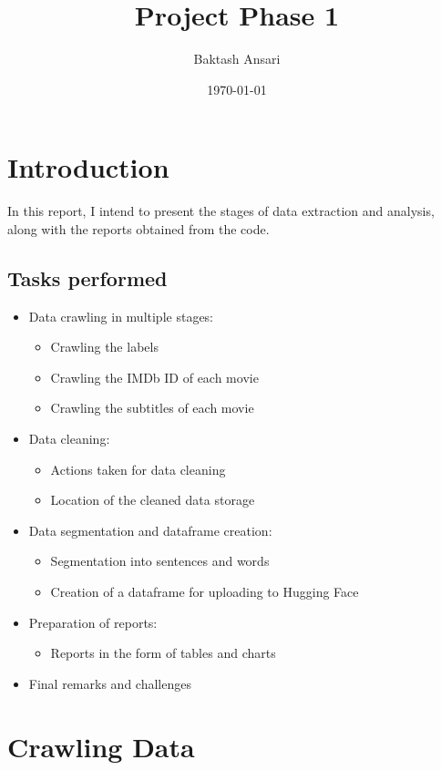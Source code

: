 \documentclass[a4paper]{article}
\title{Project Phase 1}
\author{Baktash Ansari}
\date{\today}
\begin{document}
  

\maketitle

\section{Introduction}


In this report, I intend to present the stages of data extraction and analysis, along with the reports obtained from the code.

\subsection*{Tasks performed}

\begin{itemize}
\item Data crawling in multiple stages:
\begin{itemize}
\item Crawling the labels
\item Crawling the IMDb ID of each movie
\item Crawling the subtitles of each movie
\end{itemize}
\item Data cleaning:
\begin{itemize}
\item Actions taken for data cleaning
\item Location of the cleaned data storage
\end{itemize}
\item Data segmentation and dataframe creation:
\begin{itemize}
\item Segmentation into sentences and words
\item Creation of a dataframe for uploading to Hugging Face
\end{itemize}
\item Preparation of reports:
\begin{itemize}
\item Reports in the form of tables and charts
\end{itemize}
\item Final remarks and challenges
\end{itemize}

\section{Crawling Data}
\end{document}
